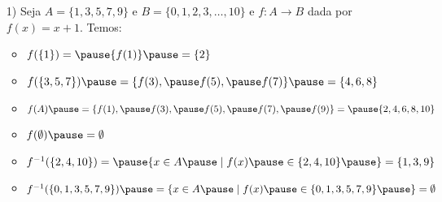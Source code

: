 \documentclass{beamer}
\begin{document}
    \begin{frame}
        \vspace{5cm}
    \end{frame}

    \begin{frame}
        \vspace{5cm}
    \end{frame}

    \begin{frame}
        \begin{exemplos}
            \begin{enumerate}
                \item[1)] Seja $A = \{1, 3, 5, 7, 9 \}$ \pause e $B = \{0, 1, 2, 3, \dots, 10\}$ \pause e $f : A \to B$ \pause dada por $f(x) = x + 1$. \pause Temos:\pause

                \vspace{.5cm}

                \begin{itemize}
                    \item $f(\{1\}) = \pause \{f(1)\} \pause= \{2\}$\pause

                    \vspace{.5cm}

                    \item $f(\{3, 5, 7\}) \pause= \{f(3), \pause f(5), \pause f(7)\} \pause = \{4, 6, 8\}$\pause

                    \vspace{.5cm}

                    \item $f(A) \pause = \{f(1), \pause f(3), \pause f(5), \pause f(7), \pause f(9)\} = \pause \{2, 4, 6, 8, 10\}$\pause

                    \vspace{.5cm}

                    \item $f(\emptyset) \pause = \emptyset$\pause

                    \vspace{.5cm}

                    \item $f^{-1}(\{2, 4, 10\}) = \pause \{x \in A \pause \mid f(x) \pause \in \{2, 4, 10\}\pause\} = \{1, 3, 9\}$\pause

                    \vspace{.5cm}

                    \item $f^{-1}(\{0, 1, 3, 5, 7, 9\}) \pause = \{x \in A \pause \mid f(x) \pause \in \{0, 1, 3, 5, 7, 9\}\pause\} = \emptyset$\pause

                    \vspace{.5cm}
                \end{itemize}
            \end{enumerate}
        \end{exemplos}
    \end{frame}
\end{document}
